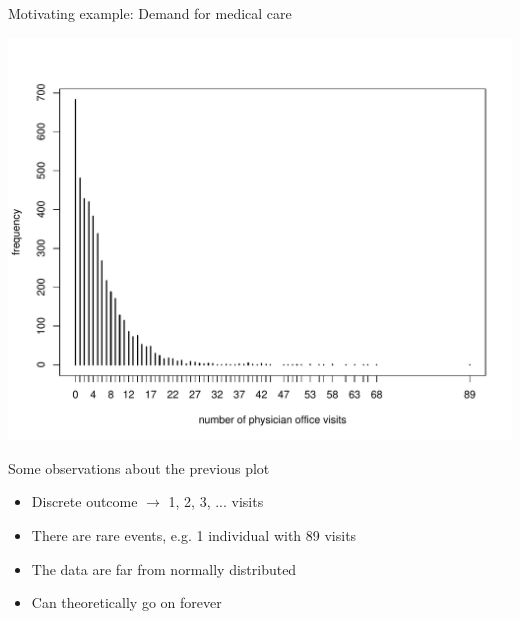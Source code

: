 \documentclass[handout]{beamer}\usepackage[]{graphicx}\usepackage[]{color}
\newenvironment{knitrout}{}{} %
\begin{document}
\begin{frame}[fragile]{Motivating example: Demand for medical care}

\vspace*{-0.2in}

\begin{knitrout}\scriptsize
{}\color{fgcolor}

{\centering \includegraphics[width=1\linewidth]{figure/unnamed-chunk-1-1} 

}



\end{knitrout}


\end{frame}


\begin{frame}{Some observations about the previous plot}

\begin{itemize}
\setlength\itemsep{1em}
\item Discrete outcome $\to$ 1, 2, 3, ... visits \pause 
\item There are rare events, e.g. 1 individual with 89 visits \pause 
\item The data are far from normally distributed \pause
\item Can theoretically go on forever
\end{itemize}

\end{frame}
\end{document}
